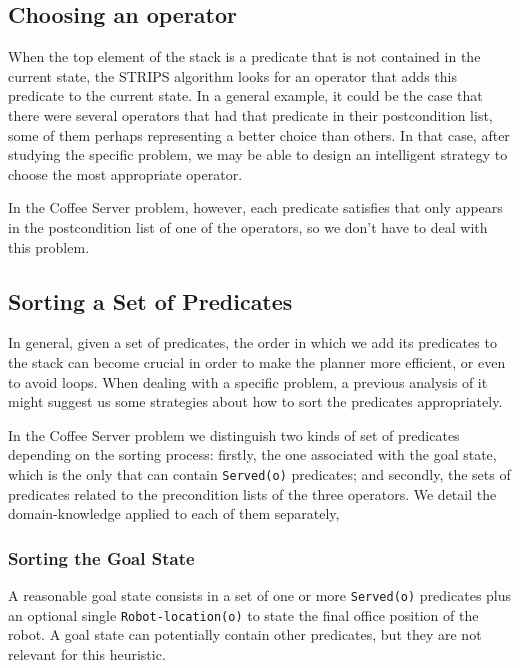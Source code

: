 \documentclass[12pt,a4paper,oneside]{article}
\numberwithin{equation}{section}
\numberwithin{equation}{section}
\theoremstyle{definition}
\begin{document}
\subsection{Choosing an operator} \label{Choosing an Operator}

When the top element of the stack is a predicate that is not contained in the current state, the STRIPS algorithm looks for an operator that adds this predicate to the current state. In a general example, it could be the case that there were several operators that had that predicate in their postcondition list, some of them perhaps representing a better choice than others. In that case, after studying the specific problem, we may be able to design an intelligent strategy to choose the most appropriate operator. 


In the Coffee Server problem, however, each predicate satisfies that only appears in the postcondition list of one of the operators, so we don’t have to deal with this problem.

\subsection{Sorting a Set of Predicates} \label{Sorting a Set of Predicates}

In general, given a set of predicates, the order in which we add its predicates to the stack can become crucial in order to make the planner more efficient, or even to avoid loops. When dealing with a specific problem, a previous analysis of it might suggest us some strategies about how to sort the predicates appropriately.


In the Coffee Server problem we distinguish two kinds of set of predicates depending on the sorting process: firstly, the one associated with the goal state, which is the only that can contain \texttt{Served(o)} predicates; and secondly, the sets of predicates related to the precondition lists of the three operators. We detail the domain-knowledge applied to each of them separately, 

\subsubsection{Sorting the Goal State}

A reasonable goal state consists in a set of one or more \texttt{Served(o)} predicates plus an optional single \texttt{Robot-location(o)} to state the final office position of the robot. A goal state can potentially contain other predicates, but they are not relevant for this heuristic.
\end{document}
